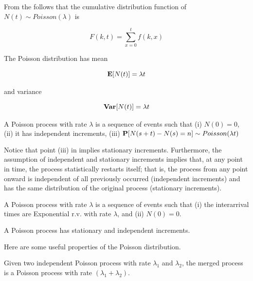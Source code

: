 From the  follows that the cumulative distribution function of $N(t) \sim Poisson(\lambda)$ is 

\begin{equation}
\label{eqn:Poisson-CDF}
F(k,t) = \sum_{x=0}^{t} f(k,x)
\end{equation}

The Poisson distribution has mean

\begin{equation}
\label{eqn:Poisson-Mean}
\expected{N(t)} = \lambda t
\end{equation}

and variance

\begin{equation}
\label{eqn:Poisson-Variance}
\variance{N(t)} = \lambda t
\end{equation}

\begin{definition}
\label{def:poisson-process-statistical}
	A Poisson process with rate $\lambda$ is a sequence of events such that
	(i) $N(0)=0$,
	(ii) it has independent increments,
	(iii) $\mathbf{P}[N(s+t)-N(s) = n] \sim Poisson(\lambda t)$
\end{definition}

Notice that point (iii) in  implies stationary increments. 
Furthermore, the assumption of independent and stationary increments implies that, at any point in time, the process statistically restarts itself; that is, the process from any point onward is independent of all previously occurred (independent increments) and has the same distribution of the original process (stationary increments).

\begin{definition}
\label{def:poisson-process-practical}
	A Poisson process with rate $\lambda$ is a sequence of events such that
	(i) the interarrival times are Exponential r.v. with rate $\lambda$, and 
	(ii) $N(0)=0$.
\end{definition}

A Poisson process has stationary and independent increments.

Here are some useful properties of the Poisson distribution.

\begin{theorem}
\label{thm:Poisson-Merging}	
	Given two independent Poisson process with rate $\lambda_{1}$ and $\lambda_{2}$, the merged process is a Poisson process with rate $(\lambda_{1} + \lambda_{2})$.
\end{theorem}

